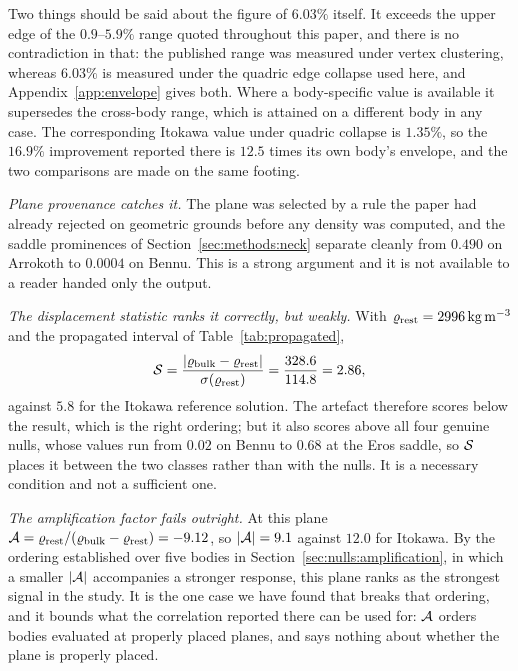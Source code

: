Two things should be said about the figure of $6.03\%$ itself. It exceeds
the upper edge of the $0.9$--$5.9\%$ range quoted throughout this paper, and
there is no contradiction in that: the published range was measured under
vertex clustering, whereas $6.03\%$ is measured under the quadric edge
collapse used here, and Appendix~\ref{app:envelope} gives both. Where a
body-specific value is available it supersedes the cross-body range, which is
attained on a different body in any case. The corresponding Itokawa value
under quadric collapse is $1.35\%$, so the $16.9\%$ improvement reported
there is $12.5$ times its own body's envelope, and the two comparisons are
made on the same footing.

\emph{Plane provenance catches it.} The plane was selected by a rule the
paper had already rejected on geometric grounds before any density was
computed, and the saddle prominences of Section~\ref{sec:methods:neck}
separate cleanly from $0.490$ on Arrokoth to $0.0004$ on Bennu. This is a
strong argument and it is not available to a reader handed only the
output.

\emph{The displacement statistic ranks it correctly, but weakly.} With
$\varrho_{\mathrm{rest}} = \SI{2996}{\kilo\gram\per\cubic\metre}$ and the propagated
interval of Table~\ref{tab:propagated},
%
\begin{equation}
\mathcal{S} = \frac{\lvert\varrho_{\mathrm{bulk}}-\varrho_{\mathrm{rest}}\rvert}{\sigma(\varrho_{\mathrm{rest}})}
       = \frac{328.6}{114.8} = 2.86 ,
\label{eq:smisplaced}
\end{equation}
%
against $5.8$ for the Itokawa reference solution. The artefact therefore
scores below the result, which is the right ordering; but it also scores
above all four genuine nulls, whose values run from $0.02$ on Bennu to
$0.68$ at the Eros saddle, so $\mathcal{S}$ places it between the two classes
rather than with the nulls. It is a necessary condition and not a
sufficient one.

\emph{The amplification factor fails outright.} At this plane
$\mathcal{A} = \varrho_{\mathrm{rest}}/(\varrho_{\mathrm{bulk}}-\varrho_{\mathrm{rest}}) = -9.12$, so
$\lvert\mathcal{A}\rvert = 9.1$ against $12.0$ for Itokawa. By the ordering
established over five bodies in Section~\ref{sec:nulls:amplification}, in
which a smaller $\lvert\mathcal{A}\rvert$ accompanies a stronger response,
this plane ranks as the strongest signal in the study. It is the one case
we have found that breaks that ordering, and it bounds what the
correlation reported there can be used for: $\mathcal{A}$ orders bodies
evaluated at properly placed planes, and says nothing about whether the
plane is properly placed.

